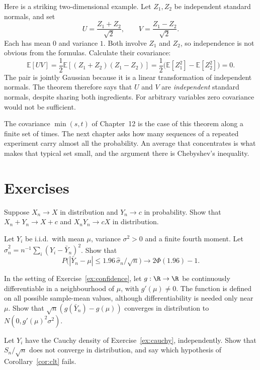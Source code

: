 Here is a striking two-dimensional example. Let $Z_1,Z_2$ be independent standard normals, and set
\[
 U=\frac{Z_1+Z_2}{\sqrt2},\qquad
 V=\frac{Z_1-Z_2}{\sqrt2}.
\]
Each has mean $0$ and variance $1$. Both involve $Z_1$ and $Z_2$, so independence is not obvious from the formulas. Calculate their covariance:
\[
 \mathbb E[UV]
 =\frac12\mathbb E[(Z_1+Z_2)(Z_1-Z_2)]
 =\frac12\bigl(\mathbb E[Z_1^2]-\mathbb E[Z_2^2]\bigr)=0.
\]
The pair is jointly Gaussian because it is a linear transformation of independent normals. The theorem therefore says that $U$ and $V$ are \emph{independent} standard normals, despite sharing both ingredients. For arbitrary variables zero covariance would not be sufficient.

The covariance $\min(s,t)$ of Chapter~12 is the case of this theorem along a finite set of times. The next chapter asks how many sequences of a repeated experiment carry almost all the probability. An average that concentrates is what makes that typical set small, and the argument there is Chebyshev's inequality.

\section{Exercises}

\begin{exercise}[$\star\star$]\label{ex:slutsky}
Suppose $X_n\to X$ in distribution and $Y_n\to c$ in probability. Show that $X_n+Y_n\to X+c$ and $X_n Y_n\to cX$ in distribution.
\end{exercise}

\begin{exercise}[$\star$]\label{ex:confidence}
Let $Y_i$ be i.i.d.\ with mean $\mu$, variance $\sigma^2>0$ and a finite fourth moment. Let $\hat\sigma_n^2=n^{-1}\sum_i(Y_i-\bar Y_n)^2$. Show that
\[
 P\bigl(|\bar Y_n-\mu|\le 1.96\,\hat\sigma_n/\sqrt n\bigr)\to 2\Phi(1.96)-1.
\]
\end{exercise}

\begin{exercise}[$\star\star$]\label{ex:delta}
In the setting of Exercise~\ref{ex:confidence}, let $g:\R\to\R$ be continuously differentiable in a neighbourhood of $\mu$, with $g'(\mu)\ne0$. The function is defined on all possible sample-mean values, although differentiability is needed only near $\mu$. Show that $\sqrt n(g(\bar Y_n)-g(\mu))$ converges in distribution to $N(0,g'(\mu)^2\sigma^2)$.
\end{exercise}

\begin{exercise}[$\star$]\label{ex:cauchyclt}
Let $Y_i$ have the Cauchy density of Exercise~\ref{ex:cauchy}, independently. Show that $S_n/\sqrt n$ does not converge in distribution, and say which hypothesis of Corollary~\ref{cor:clt} fails.
\end{exercise}

